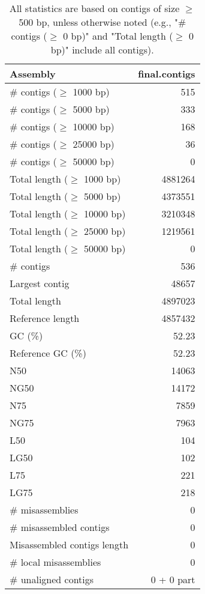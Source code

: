 \documentclass[12pt,a4paper]{article}
\begin{document}
\begin{table}[ht]
\begin{center}
\caption{All statistics are based on contigs of size $\geq$ 500 bp, unless otherwise noted (e.g., "\# contigs ($\geq$ 0 bp)" and "Total length ($\geq$ 0 bp)" include all contigs).}
\begin{tabular}{|l*{1}{|r}|}
\hline
Assembly & final.contigs \\ \hline
\# contigs ($\geq$ 1000 bp) & 515 \\ \hline
\# contigs ($\geq$ 5000 bp) & 333 \\ \hline
\# contigs ($\geq$ 10000 bp) & 168 \\ \hline
\# contigs ($\geq$ 25000 bp) & 36 \\ \hline
\# contigs ($\geq$ 50000 bp) & 0 \\ \hline
Total length ($\geq$ 1000 bp) & 4881264 \\ \hline
Total length ($\geq$ 5000 bp) & 4373551 \\ \hline
Total length ($\geq$ 10000 bp) & 3210348 \\ \hline
Total length ($\geq$ 25000 bp) & 1219561 \\ \hline
Total length ($\geq$ 50000 bp) & 0 \\ \hline
\# contigs & 536 \\ \hline
Largest contig & 48657 \\ \hline
Total length & 4897023 \\ \hline
Reference length & 4857432 \\ \hline
GC (\%) & 52.23 \\ \hline
Reference GC (\%) & 52.23 \\ \hline
N50 & 14063 \\ \hline
NG50 & 14172 \\ \hline
N75 & 7859 \\ \hline
NG75 & 7963 \\ \hline
L50 & 104 \\ \hline
LG50 & 102 \\ \hline
L75 & 221 \\ \hline
LG75 & 218 \\ \hline
\# misassemblies & 0 \\ \hline
\# misassembled contigs & 0 \\ \hline
Misassembled contigs length & 0 \\ \hline
\# local misassemblies & 0 \\ \hline
\# unaligned contigs & 0 + 0 part \\ \hline

\end{tabular}
\end{center}
\end{table}
\end{document}
